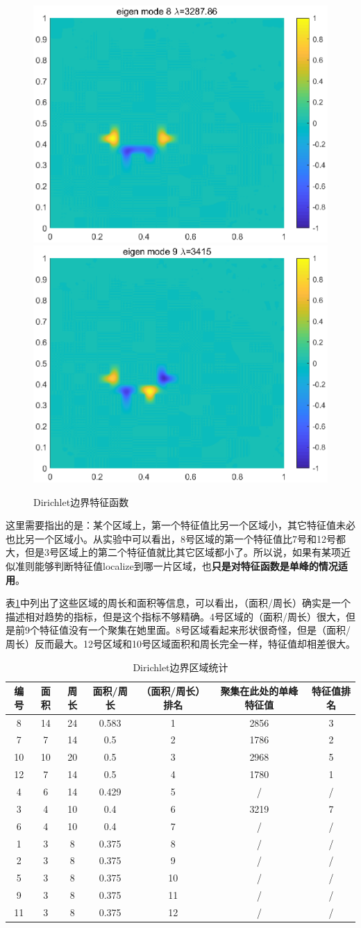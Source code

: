 \documentclass[12pt,a4paper]{article}
\begin{document}
\begin{figure}[htbp]
\includegraphics[width=0.3\linewidth]{locate/eigD8}
\includegraphics[width=0.3\linewidth]{locate/eigD9}
\caption{Dirichlet边界特征函数}
\label{eD}
\end{figure}

这里需要指出的是：某个区域上，第一个特征值比另一个区域小，其它特征值未必也比另一个区域小。从实验中可以看出，8号区域的第一个特征值比7号和12号都大，但是3号区域上的第二个特征值就比其它区域都小了。所以说，如果有某项近似准则能够判断特征值localize到哪一片区域，也\textbf{只是对特征函数是单峰的情况适用}。

表\ref{tD}中列出了这些区域的周长和面积等信息，可以看出，（面积/周长）确实是一个描述相对趋势的指标，但是这个指标不够精确。4号区域的（面积/周长）很大，但是前9个特征值没有一个聚集在她里面。8号区域看起来形状很奇怪，但是（面积/周长）反而最大。12号区域和10号区域面积和周长完全一样，特征值却相差很大。

\begin{table}
\centering
\begin{tabular}{c|c|c|c|c|c|c}
\hline
编号 & 面积 & 周长 & 面积/周长 & （面积/周长）排名 & 聚集在此处的单峰特征值 & 特征值排名 \\
\hline
8 & 14 & 24 & 0.583 & 1 & 2856 & 3 \\
7 & 7 & 14 & 0.5 & 2 & 1786 & 2 \\
10 & 10 & 20 & 0.5 & 3 & 2968 & 5 \\
12 & 7 & 14 & 0.5 & 4 & 1780 & 1 \\
4 & 6 & 14 & 0.429 & 5 & / & / \\
3 & 4 & 10 & 0.4 & 6 & 3219 & 7 \\
6 & 4 & 10 & 0.4 & 7 & / & / \\
1 & 3 & 8 & 0.375 & 8 & / & / \\
2 & 3 & 8 & 0.375 & 9 & / & / \\
5 & 3 & 8 & 0.375 & 10 & / & / \\
9 & 3 & 8 & 0.375 & 11 & / & / \\
11 & 3 & 8 & 0.375 & 12 & / & / \\
\hline 
\end{tabular}
\caption{Dirichlet边界区域统计}
\label{tD}
\end{table}
\end{document}
